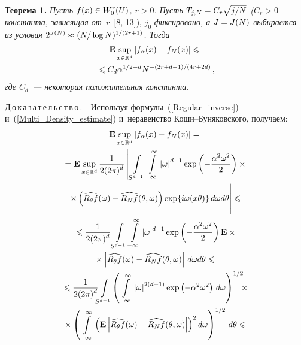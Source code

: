 \begin{multicols}{2}
\smallskip

\noindent
\textbf{Теорема 1.} \textit{Пусть $f(x)\hm\in W^r_0(U)$, $r>0$.
Пусть $T_{j,N}\hm=C_r\sqrt{j/N}$ ($C_r>0$~--- константа, зависящая
от~$r$}~[8, 13]), $j_0$ \textit{фиксировано, а $J\hm=J(N)$ выбирается
из условия $2^{J(N)}\hm\approx(N/\log N)^{1/(2r+1)}$. Тогда}
\begin{multline}
\label{Uniform_distance_alpha}
\mathbf{E}\sup\limits_{x\in \mathbb{R}^d}
\left\vert f_\alpha(x)-f_{N}(x)\right\vert\leqslant {}\\
{}\leqslant C_d\alpha^{1/2-d}N^{-({2r+d-1})/(4r+2d)}\,,
\end{multline}
\textit{где $C_d$~--- некоторая положительная константа}.

\smallskip

\noindent
Д\,о\,к\,а\,з\,а\,т\,е\,л\,ь\,с\,т\,в\,о\,.\ \
Используя формулы~(\ref{Regular_inverse}) и~(\ref{Multi_Density_estimate})
и~неравенство Ко\-ши--Бу\-ня\-ков\-ско\-го, получаем:
\begin{multline*}
\mathbf{E}\sup\limits_{x\in \mathbb{R}^d}\abs{f_\alpha(x)-f_{N}(x)}={}
\\
{}=\mathbf{E}\sup\limits_{x\in \mathbb{R}^d}\fr{1}{2(2\pi)^{d}}
\left\vert \int\limits_{\,S^{d-1}}\int\limits_{-\infty}^{\infty}
\abs{\omega}^{d-1}\exp\left(-\fr{\alpha^2\omega^2}{2}\right)\times{}\right.\\
{}\left.\times
\left(\widehat{R_\theta f}(\omega)-\widehat{R_N f}(\theta,\omega)\right)
\exp\{i\omega(x\theta)\}\,d\omega d\theta
\vphantom{\int\limits_{\,S^{d-1}}\int\limits_{-\infty}^{\infty}}
\right\vert\leqslant{}\\
{}\leqslant\fr{1}{2(2\pi)^{d}}\int\limits_{S^{d-1}}
\int\limits_{-\infty}^{\infty}\abs{\omega}^{d-1}
\exp\left(-\fr{\alpha^2\omega^2}{2}\right)\mathbf{E}\times{}\\
{}\times
\abs{\widehat{R_\theta f}(\omega)-\widehat{R_N f}(\theta,\omega)}
\,d\omega d\theta\leqslant{}\\
{}\leqslant\fr{1}{2(2\pi)^{d}}\!\!\int\limits_{S^{d-1}}\!\left(
\int\limits_{\,-\infty}^{\infty}
\abs{\omega}^{2(d-1)}\exp\left(-\alpha^2\omega^2\right)\,d\omega\right)^{1/2}\!\!\!\times{}\\
{}\times \left(
\int\limits_{\,-\infty}^{\infty}\left(\mathbf{E}
\abs{\widehat{R_\theta f}(\omega)-\widehat{R_N f}(\theta,\omega)}\right)^2d
\omega\right)^{1/2}\, d\theta\leqslant{}
\end{multline*}


\end{multicols}
